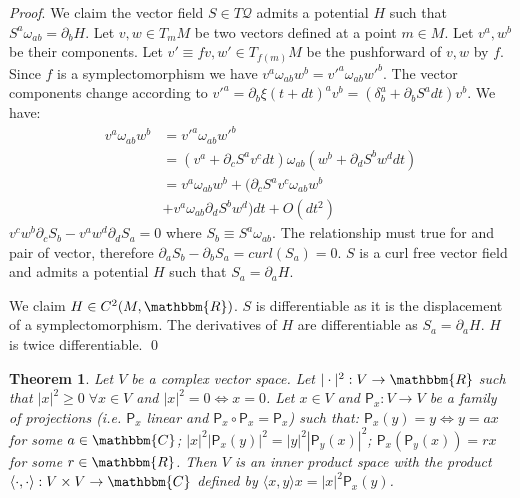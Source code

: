 \documentclass[aps,pra,10pt,twocolumn,floatfix,nofootinbib]{revtex4-1}
\numberwithin{equation}{section}
\newtheorem{thrm}[equation]{Theorem}
\theoremstyle{definition}
\renewenvironment{proof}{\emph{Proof}.}{\qed}
\begin{document}
\begin{proof}
	We claim the vector field $S \in T\mathcal{Q}$ admits a potential $H$ such that $S^{a} \omega_{ab} = \partial_{b}H$. Let $v, w \in T_m M$ be two vectors defined at a point $m \in M$. Let $v^a, w^b$ be their components. Let $v'\equiv f v, w' \in T_{f(m)}M$ be the pushforward of $v, w$ by $f$. Since $f$ is a symplectomorphism we have $v^{a} \omega_{ab} w^{b} = v'^{a} \omega_{ab} w'^{b}$. The vector components change according to $v'^a = \partial_b \xi(t+dt)^a v^b = (\delta^a_b + \partial_b S^a dt) v^b$. We have:
	\begin{align*}
	v^{a} \omega_{ab} w^{b} &= v'^{a} \omega_{ab} w'^{b}  \\
	&= (v^{a} + \partial_{c} S^{a} v^{c} dt) \omega_{ab} ( w^{b} + \partial_{d} S^{b} w^{d} dt) \\
	&= v^{a} \omega_{ab} w^{b} + (\partial_{c} S^{a} v^{c} \omega_{ab} w^{b} \\
	&+ v^{a} \omega_{ab} \partial_{d} S^{b} w^{d}) dt + O(dt^2)
	\end{align*}
	$v^{c} w^{b} \partial_{c} S_{b} - v^{a} w^{d} \partial_{d} S_{a} = 0$ where $S_{b} \equiv S^{a} \omega_{ab}$. The relationship must true for and pair of vector, therefore $\partial_{a} S_{b} - \partial_{b} S_{a} = curl(S_{a}) = 0$. $S$ is a curl free vector field and admits a potential $H$ such that $S_{a} = \partial_{a}H$.
	
	We claim $H \in C^2(M, \mathbbm{R})$. $S$ is differentiable as it is the displacement of a symplectomorphism. The derivatives of $H$ are differentiable as $S_{a} = \partial_{a}H$. $H$ is twice differentiable.
\end{proof}

\begin{thrm}\label{thrm:inner_product}
	Let $V$ be a complex vector space. Let $| \cdot | ^2 : V \rightarrow \mathbbm{R}$ such that $|x|^2 \ge 0 \; \forall x \in V$ and $|x|^2 = 0 \Leftrightarrow x = 0$. Let $x \in V$ and $\mathsf{P}_x : V \rightarrow V$ be a family of projections (i.e. $\mathsf{P}_x$ linear and $\mathsf{P}_x \circ \mathsf{P}_x = \mathsf{P}_x$) such that: $\mathsf{P}_x (y) = y \Leftrightarrow y = a x$ for some $a \in \mathbbm{C}$; $|x|^2|\mathsf{P}_x (y)|^2=|y|^2|\mathsf{P}_y (x)|^2$; $\mathsf{P}_x (\mathsf{P}_y (x)) = r x$ for some $r \in \mathbbm{R}$.
	Then $V$ is an inner product space with the product $\langle \cdot , \cdot \rangle : V \times V \rightarrow \mathbbm{C}$ defined by $\langle x , y \rangle x = |x|^2 \mathsf{P}_x (y)$.
\end{thrm}
\end{document}
